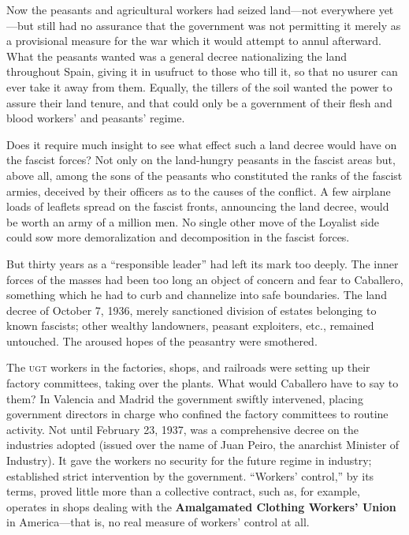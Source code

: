 Now the peasants and agricultural workers had seized land---not everywhere yet---but still had no assurance that the government was not permitting it merely as a provisional measure for the war which it would attempt to annul afterward. What the peasants wanted was a general decree nationalizing the land throughout Spain, giving it in usufruct to those who till it, so that no usurer can ever take it away from them. Equally, the tillers of the soil wanted the power to assure their land tenure, and that could only be a government of their flesh and blood workers’ and peasants’ regime.

Does it require much insight to see what effect such a land decree would have on the fascist forces? Not only on the land-hungry peasants in the fascist areas but, above all, among the sons of the peasants who constituted the ranks of the fascist armies, deceived by their officers as to the causes of the conflict. A few airplane loads of leaflets spread on the fascist fronts, announcing the land decree, would be worth an army of a million men. No single other move of the Loyalist side could sow more demoralization and decomposition in the fascist forces.

But thirty years as a ``responsible leader'' had left its mark too deeply. The inner forces of the masses had been too long an object of concern and fear to Caballero, something which he had to curb and channelize into safe boundaries. The land decree of October 7, 1936, merely sanctioned division of estates belonging to known fascists; other wealthy landowners, peasant exploiters, etc., remained untouched. The aroused hopes of the peasantry were smothered.

The \textsc{ugt} workers in the factories, shops, and railroads were setting up their factory committees, taking over the plants. What would Caballero have to say to them? In Valencia and Madrid the government swiftly intervened, placing government directors in charge who confined the factory committees to routine activity. Not until February 23, 1937, was a comprehensive decree on the industries adopted (issued over the name of Juan Peiro, the anarchist Minister of Industry). It gave the workers no security for the future regime in industry; established strict intervention by the government. ``Workers’ control,'' by its terms, proved little more than a collective contract, such as, for example, operates in shops dealing with the \textbf{Amalgamated Clothing Workers’ Union} in America---that is, no real measure of workers’ control at all.

